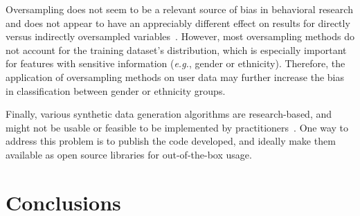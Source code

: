 \documentclass[parskip=full]{scrartcl}
\begin{document}

Oversampling does not seem to be a relevant source of bias in behavioral
research and does not appear to have an appreciably different effect on
results for directly versus indirectly oversampled
variables~\cite{hauner2014latent}. However, most oversampling methods do not
account for the training dataset's distribution, which is especially important
for features with sensitive information (\textit{e.g.}, gender or ethnicity).
Therefore, the application of oversampling methods on user data may further
increase the bias in classification between gender or ethnicity groups.

Finally, various synthetic data generation algorithms are research-based, and
might not be usable or feasible to be implemented by
practitioners~\cite{bayer2021survey}. One way to address this problem is to
publish the code developed, and ideally make them available as open source
libraries for out-of-the-box usage.



% 

\section{Conclusions}\label{sec:conclusions}
\end{document}
